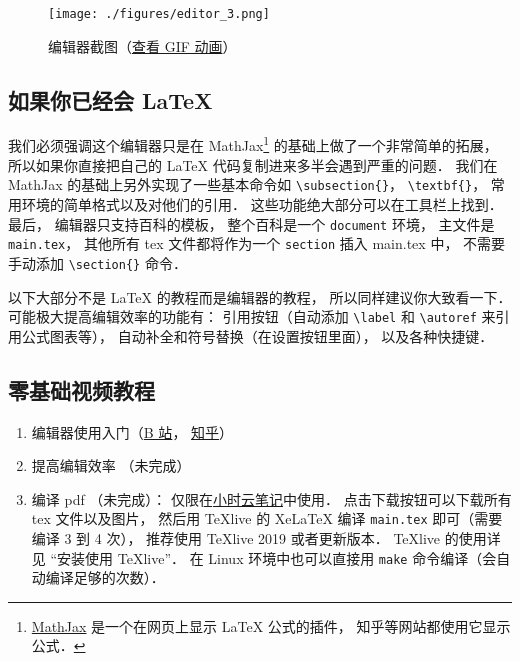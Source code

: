 
\begin{figure}[ht]
\centering
\texttt{[image: ./figures/editor\_3.png]}
\caption{编辑器截图（\href{https://wuli.wiki/apps/editor.gif}{查看 GIF 动画}）} \label{editor_fig3}
\end{figure}

\subsection{如果你已经会 LaTeX}
我们必须强调这个编辑器只是在 MathJax\footnote{\href{https://www.mathjax.org/}{MathJax} 是一个在网页上显示 LaTeX 公式的插件， 知乎等网站都使用它显示公式．} 的基础上做了一个非常简单的拓展， 所以如果你直接把自己的 LaTeX 代码复制进来多半会遇到严重的问题． 我们在 MathJax 的基础上另外实现了一些基本命令如 \verb|\subsection{}|， \verb|\textbf{}|， 常用环境的简单格式以及对他们的引用． 这些功能绝大部分可以在工具栏上找到． 最后， 编辑器只支持百科的模板， 整个百科是一个 \verb|document| 环境， 主文件是 \verb|main.tex|， 其他所有 tex 文件都将作为一个 \verb|section| 插入 main.tex 中， 不需要手动添加 \verb|\section{}| 命令．

以下大部分不是 LaTeX 的教程而是编辑器的教程， 所以同样建议你大致看一下． 可能极大提高编辑效率的功能有： 引用按钮（自动添加 \verb|\label| 和 \verb|\autoref| 来引用公式图表等）， 自动补全和符号替换（在设置按钮里面）， 以及各种快捷键．

\subsection{零基础视频教程}
\begin{enumerate}
\item 编辑器使用入门（\href{https://www.bilibili.com/video/av87698355/}{B 站}， \href{https://zhuanlan.zhihu.com/p/105869878}{知乎}）
\item 提高编辑效率 （未完成）
\item 编译 pdf （未完成）： 仅限在\href{http://wuli.wiki/note/}{小时云笔记}中使用． 点击下载按钮可以下载所有 tex 文件以及图片， 然后用 TeXlive 的 XeLaTeX 编译 \verb|main.tex| 即可（需要编译 3 到 4 次）， 推荐使用 TeXlive 2019 或者更新版本． TeXlive 的使用详见 “安装使用 TeXlive”． 在 Linux 环境中也可以直接用 \verb|make| 命令编译（会自动编译足够的次数）．
\end{enumerate}

